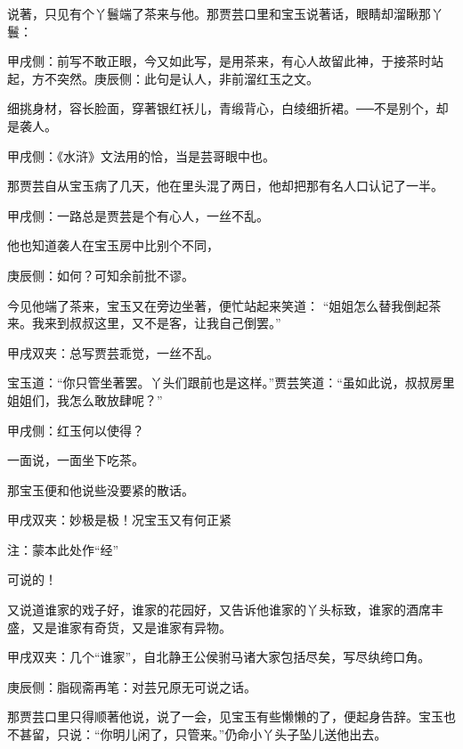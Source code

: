 \begin{parag}
    说著，只见有个丫鬟端了茶来与他。那贾芸口里和宝玉说著话，眼睛却溜瞅那丫鬟：\begin{note}甲戌侧：前写不敢正眼，今又如此写，是用茶来，有心人故留此神，于接茶时站起，方不突然。庚辰侧：此句是认人，非前溜红玉之文。\end{note}细挑身材，容长脸面，穿著银红袄儿，青缎背心，白绫细折裙。──不是别个，却是袭人。\begin{note}甲戌侧：《水浒》文法用的恰，当是芸哥眼中也。\end{note}那贾芸自从宝玉病了几天，他在里头混了两日，他却把那有名人口认记了一半。\begin{note}甲戌侧：一路总是贾芸是个有心人，一丝不乱。\end{note}他也知道袭人在宝玉房中比别个不同，\begin{note}庚辰侧：如何？可知余前批不谬。\end{note}今见他端了茶来，宝玉又在旁边坐著，便忙站起来笑道： “姐姐怎么替我倒起茶来。我来到叔叔这里，又不是客，让我自己倒罢。”\begin{note}甲戌双夹：总写贾芸乖觉，一丝不乱。\end{note}宝玉道：“你只管坐著罢。丫头们跟前也是这样。”贾芸笑道：“虽如此说，叔叔房里姐姐们，我怎么敢放肆呢？”\begin{note}甲戌侧：红玉何以使得？\end{note}一面说，一面坐下吃茶。
\end{parag}


\begin{parag}
    那宝玉便和他说些没要紧的散话。\begin{note}甲戌双夹：妙极是极！况宝玉又有何正紧\begin{subnote}注：蒙本此处作“经”\end{subnote}可说的！\end{note}又说道谁家的戏子好，谁家的花园好，又告诉他谁家的丫头标致，谁家的酒席丰盛，又是谁家有奇货，又是谁家有异物。\begin{note}甲戌双夹：几个“谁家”，自北静王公侯驸马诸大家包括尽矣，写尽纨绔口角。\end{note}\begin{note}庚辰侧：脂砚斋再笔：对芸兄原无可说之话。\end{note}那贾芸口里只得顺著他说，说了一会，见宝玉有些懒懒的了，便起身告辞。宝玉也不甚留，只说：“你明儿闲了，只管来。”仍命小丫头子坠儿送他出去。
\end{parag}



